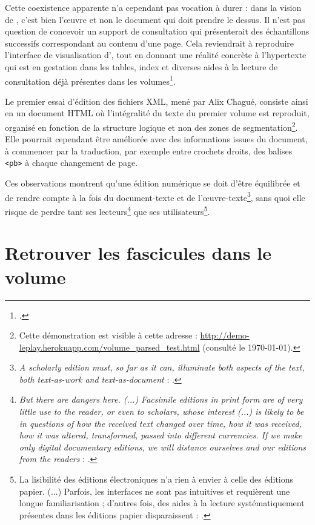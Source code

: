 Cette coexistence apparente n'a cependant pas vocation à durer : dans la vision de \timeus, c'est bien l'\oe{}uvre et non le document qui doit prendre le dessus. Il n'est pas question de concevoir un support de consultation qui présenterait des échantillons successifs correspondant au contenu d'une page. Cela reviendrait à reproduire l'interface de visualisation d'\ia, tout en donnant une réalité concrète à l'hypertexte qui est \og en gestation dans les tables, index et diverses aides à la lecture de consultation déjà présentes \fg{} dans les volumes\footcite[p. 19]{duval}.

Le premier essai d'édition des fichiers XML, mené par Alix Chagué, consiste ainsi en un document HTML où l'intégralité du texte du premier volume est reproduit, organisé en fonction de la structure logique et non des zones de segmentation\footnote{Cette démonstration est visible à cette adresse : \url{http://demo-leplay.herokuapp.com/volume_parsed_test.html} (consulté le \today).}. Elle pourrait cependant être améliorée avec des informations issues du document, à commencer par la traduction, par exemple entre crochets droits, des balises \texttt{<pb>} à chaque changement de page.

Ces observations montrent qu'une édition numérique se doit d'être équilibrée et de rendre compte à la fois du document-texte et de l'\oe{}uvre-texte\footnote{\og \textit{A scholarly edition must, so far as it can, illuminate both aspects of the text, both text-as-work and text-as-document} \fg{} : \cite[p. 123]{robinson}.}, sans quoi elle risque de perdre tant ses lecteurs\footnote{\og \textit{But there are dangers here. (...) Facsimile editions in print form are of very little use to the reader, or even to scholars, whose interest (...) is likely to be in questions of how the received text changed over time, how it was received, how it was altered, transformed, passed into different currencies. If we make only digital documentary editions, we will distance ourselves and our editions from the readers} \fg{} : \cite[p. 127]{robinson}.} que ses utilisateurs\footnote{\og La lisibilité des éditions électroniques n’a rien à envier à celle des éditions papier. (...) Parfois, les interfaces ne sont pas intuitives et requièrent une longue familiarisation ; d’autres fois, des aides à la lecture systématiquement présentes dans les éditions papier disparaissent \fg{} : \cite[p. 21]{duval}.}.

\section{Retrouver les fascicules dans le volume}

